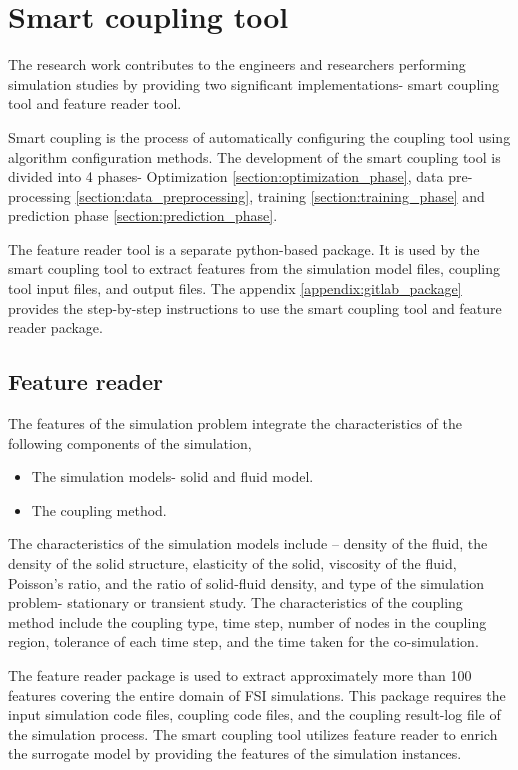 \section{Smart coupling tool}
\label{chapter:implementation}

The research work contributes to the engineers and researchers performing simulation studies by providing two significant implementations- smart coupling tool and feature reader tool.

Smart coupling is the process of automatically configuring the coupling tool using algorithm configuration methods. The development of the smart coupling tool is divided into 4 phases- Optimization \ref{section:optimization_phase}, data pre-processing \ref{section:data_preprocessing}, training \ref{section:training_phase} and prediction phase \ref{section:prediction_phase}.

The feature reader tool is a separate python-based package. It is used by the smart coupling tool to extract features from the simulation model files, coupling tool input files, and output files. The appendix \ref{appendix:gitlab_package} provides the step-by-step instructions to use the smart coupling tool and feature reader package. 

\subsection{Feature reader}
\label{section:feature_reader}

The features of the simulation problem integrate the characteristics of the following components of the simulation,

\begin{itemize}
\item The simulation models- solid and fluid model.
\item The coupling method.
\end{itemize}

The characteristics of the simulation models include – density of the fluid, the density of the solid structure, elasticity of the solid, viscosity of the fluid, Poisson's ratio, and the ratio of solid-fluid density, and type of the simulation problem- stationary or transient study.   The characteristics of the coupling method include the coupling type, time step, number of nodes in the coupling region, tolerance of each time step, and the time taken for the co-simulation.

The feature reader package is used to extract approximately more than 100 features covering the entire domain of FSI simulations. This package requires the input simulation code files, coupling code files, and the coupling result-log file of the simulation process. The smart coupling tool utilizes feature reader to enrich the surrogate model by providing the features of the simulation instances.

